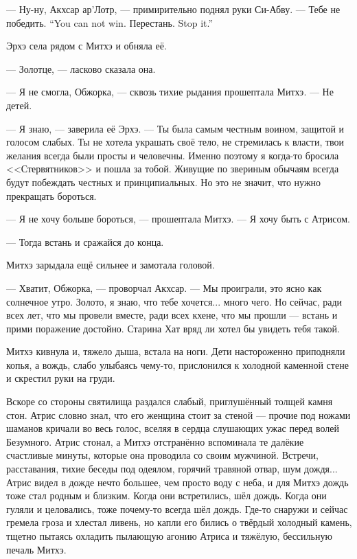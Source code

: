 --- Ну-ну, Акхсар ар’Лотр, --- примирительно поднял руки Си-Абву.
{--- Тебе не победить.}
{``You can not win.}
{Перестань.}
{Stop it.''}

Эрхэ села рядом с Митхэ и обняла её.

--- Золотце, --- ласково сказала она.

--- Я не смогла, Обжорка, --- сквозь тихие рыдания прошептала Митхэ.
--- Не детей.

--- Я знаю, --- заверила её Эрхэ.
--- Ты была самым честным воином, защитой и голосом слабых.
Ты не хотела украшать своё тело, не стремилась к власти, твои желания всегда были просты и человечны.
Именно поэтому я когда-то бросила <<Стервятников>> и пошла за тобой.
Живущие по звериным обычаям всегда будут побеждать честных и принципиальных.
Но это не значит, что нужно прекращать бороться.

--- Я не хочу больше бороться, --- прошептала Митхэ.
--- Я хочу быть с Атрисом.

--- Тогда встань и сражайся до конца.

Митхэ зарыдала ещё сильнее и замотала головой.

--- Хватит, Обжорка, --- проворчал Акхсар.
--- Мы проиграли, это ясно как солнечное утро.
Золото, я знаю, что тебе хочется... много чего.
Но сейчас, ради всех лет, что мы провели вместе, ради всех кхене, что мы прошли --- встань и прими поражение достойно.
Старина Хат вряд ли хотел бы увидеть тебя такой.

Митхэ кивнула и, тяжело дыша, встала на ноги.
Дети настороженно приподняли копья, а вождь, слабо улыбаясь чему-то, прислонился к холодной каменной стене и скрестил руки на груди.

Вскоре со стороны святилища раздался слабый, приглушённый толщей камня стон.
Атрис словно знал, что его женщина стоит за стеной --- прочие под ножами шаманов кричали во весь голос, вселяя в сердца слушающих ужас перед волей Безумного.
Атрис стонал, а Митхэ отстранённо вспоминала те далёкие счастливые минуты, которые она проводила со своим мужчиной.
Встречи, расставания, тихие беседы под одеялом, горячий травяной отвар, шум дождя...
Атрис видел в дожде нечто большее, чем просто воду с неба, и для Митхэ дождь тоже стал родным и близким.
Когда они встретились, шёл дождь.
Когда они гуляли и целовались, тоже почему-то всегда шёл дождь.
Где-то снаружи и сейчас гремела гроза и хлестал ливень, но капли его бились о твёрдый холодный камень, тщетно пытаясь охладить пылающую агонию Атриса и тяжёлую, бессильную печаль Митхэ.

